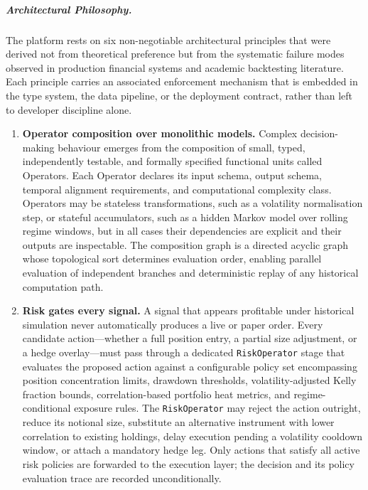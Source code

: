 \documentclass[12pt,openany]{book}
\numberwithin{equation}{chapter}
\theoremstyle{plain}
\theoremstyle{definition}
\theoremstyle{remark}
\begin{document}
\subparagraph{Architectural Philosophy.}
The platform rests on six non-negotiable architectural principles that were
derived not from theoretical preference but from the systematic failure modes
observed in production financial systems and academic backtesting literature.
Each principle carries an associated enforcement mechanism that is embedded in
the type system, the data pipeline, or the deployment contract, rather than
left to developer discipline alone.
\begin{enumerate}
    \item \textbf{Operator composition over monolithic models.} Complex
          decision-making behaviour emerges from the composition of small,
          typed, independently testable, and formally specified functional
          units called Operators. Each Operator declares its input schema,
          output schema, temporal alignment requirements, and computational
          complexity class. Operators may be stateless transformations, such
          as a volatility normalisation step, or stateful accumulators, such
          as a hidden Markov model over rolling regime windows, but in all
          cases their dependencies are explicit and their outputs are
          inspectable. The composition graph is a directed acyclic graph
          whose topological sort determines evaluation order, enabling
          parallel evaluation of independent branches and deterministic
          replay of any historical computation path.

    \item \textbf{Risk gates every signal.} A signal that appears profitable
          under historical simulation never automatically produces a live or
          paper order. Every candidate action---whether a full position entry,
          a partial size adjustment, or a hedge overlay---must pass through a
          dedicated \texttt{RiskOperator} stage that evaluates the proposed
          action against a configurable policy set encompassing position
          concentration limits, drawdown thresholds, volatility-adjusted
          Kelly fraction bounds, correlation-based portfolio heat metrics, and
          regime-conditional exposure rules. The \texttt{RiskOperator} may
          reject the action outright, reduce its notional size, substitute an
          alternative instrument with lower correlation to existing holdings,
          delay execution pending a volatility cooldown window, or attach a
          mandatory hedge leg. Only actions that satisfy all active risk
          policies are forwarded to the execution layer; the decision and its
          policy evaluation trace are recorded unconditionally.


\end{enumerate}
\end{document}
